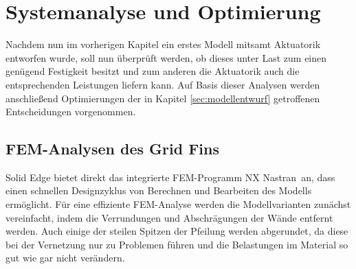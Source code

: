 \chapter{Systemanalyse und Optimierung}\label{sec:simulation}
Nachdem nun im vorherigen Kapitel ein erstes Modell mitsamt Aktuatorik entworfen wurde, soll nun überprüft werden, ob dieses unter Last zum einen genügend Festigkeit besitzt und zum anderen die Aktuatorik auch die entsprechenden Leistungen liefern kann. Auf Basis dieser Analysen werden anschließend Optimierungen der in Kapitel \ref{sec:modellentwurf} getroffenen Entscheidungen vorgenommen.


\section{FEM-Analysen des Grid Fins}
Solid Edge bietet direkt das integrierte FEM-Programm \grqq NX Nastran\grqq \ an, dass einen schnellen Designzyklus von Berechnen und Bearbeiten des Modells ermöglicht. Für eine effiziente FEM-Analyse werden die Modellvarianten zunächst vereinfacht, indem die Verrundungen und Abschrägungen der Wände entfernt werden. Auch einige der steilen Spitzen der Pfeilung werden abgerundet, da diese bei der Vernetzung nur zu Problemen führen und die Belastungen im Material so gut wie gar nicht verändern.

